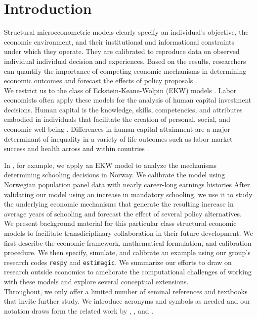 \section{Introduction}
\noindent Structural microeconometric models clearly specify an individual's objective, the economic environment, and their institutional and informational constraints under which they operate. They are calibrated to reproduce data on observed individual individual decision and experiences. Based on the results, researchers can quantify the importance of competing economic mechanisms in determining economic outcomes and forecast the effects of policy proposals \citep{Wolpin.2013}.\\

\noindent We restrict us to the class of Eckstein-Keane-Wolpin (EKW) models \citep{Adda.2017, Blundell.2016, Keane.1997}. Labor economists often apply these models for the analysis of human capital investment decisions. Human capital is the knowledge, skills, competencies, and attributes embodied in individuals that facilitate the creation of personal, social, and economic well-being \citep{Becker.1964}. Differences in human capital attainment are a major determinant of inequality in a variety of life outcomes such as labor market success and health across and within countries \citep{OECD.2001}.

In \citet{Bhuller.2018}, for example, we apply an EKW model to analyze the mechanisms determining schooling decisions in Norway. We calibrate the model using Norwegian population panel data with nearly career-long earnings histories  After validating our model using an increase in mandatory schooling, we use it to study the underlying economic mechanisms that generate the resulting increase in average years of schooling and forecast the effect of several policy alternatives.\\

\noindent We present background material for this particular class structural economic models to facilitate transdiciplinary collaboration in their future development. We first describe the economic framework, mathematical formulation, and calibration procedure.  We then specify, simulate, and calibrate an example using our group's research codes \verb+respy+ and \verb+estimagic+. We summarize our efforts to draw on research outside economics to ameliorate the computational challenges of working with these models and explore several conceptual extensions.\\

\noindent Throughout, we only offer a limited number of seminal references and textbooks that invite further study. We introduce acronyms and symbols as needed and our notation draws form the related work by \cite{Aguirregabiria.2010}, \cite{Arcidiacono.2011}, and \cite{Puterman.1994}.
